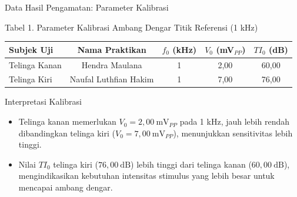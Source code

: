 \documentclass[aspectratio=169, 10pt]{beamer}
\begin{document}
	\begin{frame}{Data Hasil Pengamatan: Parameter Kalibrasi}
		\begin{block}{Tabel 1. Parameter Kalibrasi Ambang Dengar Titik Referensi (1 kHz)}
			\centering
			\vspace{0.15cm}
			\begin{tabular}{lcccc}
				\toprule
				\textbf{Subjek Uji} & \textbf{Nama Praktikan} & $f_0$ \textbf{(kHz)} & $V_0$ \textbf{(mV$_{PP}$)} & $TI_0$ \textbf{(dB)} \\
				\midrule
				Telinga Kanan & Hendra Maulana        & 1 & 2{,}00 & 60{,}00 \\
				Telinga Kiri  & Naufal Luthfian Hakim & 1 & 7{,}00 & 76{,}00 \\
				\bottomrule
			\end{tabular}
		\end{block}

		\vspace{0.25cm}
		\begin{exampleblock}{Interpretasi Kalibrasi}
			\begin{itemize}
				\item Telinga kanan memerlukan $V_0 = 2{,}00\ \text{mV}_{PP}$ pada 1 kHz, jauh lebih rendah dibandingkan telinga kiri ($V_0 = 7{,}00\ \text{mV}_{PP}$), menunjukkan sensitivitas lebih tinggi.
				\item Nilai $TI_0$ telinga kiri ($76{,}00\ \text{dB}$) lebih tinggi dari telinga kanan ($60{,}00\ \text{dB}$), mengindikasikan kebutuhan intensitas stimulus yang lebih besar untuk mencapai ambang dengar.
			\end{itemize}
		\end{exampleblock}
	\end{frame}
\end{document}
